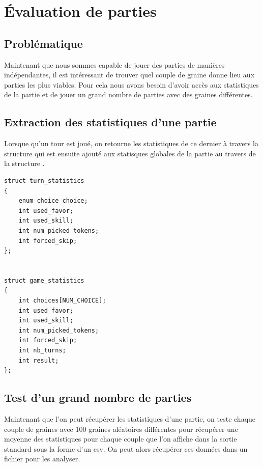\section{Évaluation de parties}

\label{evaluator}

\subsection*{Problématique}

Maintenant que nous sommes capable de jouer des parties de manières indépendantes, il est intéressant de trouver quel couple de graine donne lieu aux parties les plus viables. Pour cela nous avons besoin d'avoir accès aux statistiques de la partie et de jouer un grand nombre de parties avec des graines différentes.

\subsection{Extraction des statistiques d'une partie}

Lorsque qu'un tour est joué, on retourne les statistiques de ce dernier à travers la structure  qui est ensuite ajouté aux statisques globales de la partie au travers de la structure .

\begin{lstlisting}[frame=single, caption={Structures pour récupérer les statistiques}]
struct turn_statistics
{
	enum choice choice;
	int used_favor;
	int used_skill;
	int num_picked_tokens;
	int forced_skip;
};


struct game_statistics
{
	int choices[NUM_CHOICE];
	int used_favor;
	int used_skill;
	int num_picked_tokens;
	int forced_skip;
	int nb_turns;
	int result; 
};
\end{lstlisting}

\subsection{Test d'un grand nombre de parties}

Maintenant que l'on peut récupérer les statistiques d'une partie, on teste chaque couple de graines avec 100 graines aléatoires différentes pour récupérer une moyenne des statistiques pour chaque couple que l'on affiche dans la sortie standard sous la forme d'un csv. On peut alors récupérer ces données dans un fichier pour les analyser.

